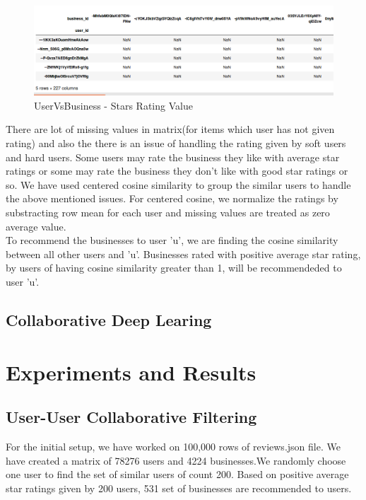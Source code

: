 \documentclass[11pt]{article}
\begin{document}
	 		\begin{figure}[h]
					\centering
					\includegraphics[scale=0.5]{uservsitem.png}
					\caption{UserVsBusiness - Stars Rating Value}
			\end{figure}
	 
There are lot of missing values in matrix(for items which user has not given rating) and also the there is an issue of handling the rating given by soft users and hard users. Some users may rate the business they like with average star ratings or some may rate the business they don't like with good star ratings or so. We have used centered cosine similarity to group the similar users to handle the above mentioned issues. For centered cosine, we normalize the ratings by substracting row mean for each user and missing values are treated as zero average value.\\

To recommend the businesses to user 'u', we are finding the cosine similarity between all other users and 'u'. Businesses rated with positive average star rating, by users of having cosine similarity greater than 1, will be recommendeded to user 'u'.
	
		\subsection{Collaborative Deep Learing}
		
		
		
	
	\section{Experiments and Results}
	
	\subsection{User-User Collaborative Filtering}

	For the initial setup, we have worked on 100,000 rows of reviews.json file. We have created a matrix of 78276 users and 4224 businesses.We randomly choose one user to find the set of similar users of count 200. Based on positive average star ratings given by 200 users, 531 set of businesses are recommended to users.
	
\end{document}
